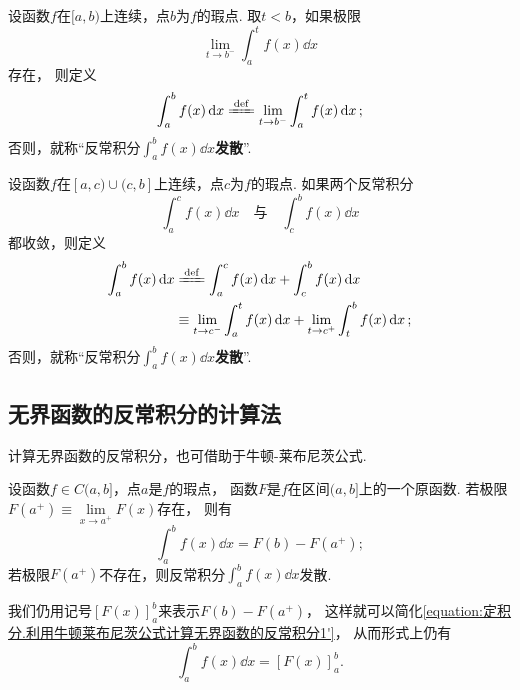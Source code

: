 \begin{definition}\label{definition:定积分.无界函数的反常积分的定义2}
设函数\(f\)在\([a,b)\)上连续，点\(b\)为\(f\)的瑕点.
取\(t < b\)，如果极限\[
\lim\limits_{t \to b^-} \int_a^t f(x) \dd{x}
\]存在，%
则定义
\begin{equation}
\int_a^b f(x) \dd{x}
\defeq
\lim\limits_{t \to b^-} \int_a^t f(x) \dd{x};
\end{equation}
否则，就称“反常积分\(\int_a^b f(x) \dd{x}\)\textbf{发散}”.
\end{definition}

\begin{definition}\label{definition:定积分.无界函数的反常积分的定义3}
设函数\(f\)在\([a,c)\cup(c,b]\)上连续，点\(c\)为\(f\)的瑕点.
如果两个反常积分\[
\int_a^c f(x) \dd{x}
\quad\text{与}\quad
\int_c^b f(x) \dd{x}
\]都收敛，则定义
\begin{equation}
\begin{split}
\int_a^b f(x) \dd{x}
&\defeq \int_a^c f(x) \dd{x} + \int_c^b f(x) \dd{x} \\
&\equiv \lim\limits_{t \to c^-} \int_a^t f(x) \dd{x}
	+ \lim\limits_{t \to c^+} \int_t^b f(x) \dd{x};
\end{split}
\end{equation}
否则，就称“反常积分\(\int_a^b f(x) \dd{x}\)\textbf{发散}”.
\end{definition}

\subsection{无界函数的反常积分的计算法}
计算无界函数的反常积分，也可借助于牛顿-莱布尼茨公式.
\begin{theorem}\label{theorem:定积分.利用牛顿莱布尼茨公式计算无界函数的反常积分1}
设函数\(f \in C(a,b]\)，点\(a\)是\(f\)的瑕点，%
函数\(F\)是\(f\)在区间\((a,b]\)上的一个原函数.
若极限\(F(a^+) \equiv \lim\limits_{x \to a^+} F(x)\)存在，%
则有
\begin{equation}\label{equation:定积分.利用牛顿莱布尼茨公式计算无界函数的反常积分1'}
\int_a^b f(x) \dd{x}
= F(b) - F(a^+);
\end{equation}
若极限\(F(a^+)\)不存在，则反常积分\(\int_a^b f(x) \dd{x}\)发散.
\end{theorem}
我们仍用记号\([F(x)]_a^b\)来表示\(F(b) - F(a^+)\)，%
这样就可以简化\cref{equation:定积分.利用牛顿莱布尼茨公式计算无界函数的反常积分1'}，%
从而形式上仍有
\begin{equation}\label{equation:定积分.利用牛顿莱布尼茨公式计算无界函数的反常积分1}
\int_a^b f(x) \dd{x} = [F(x)]_a^b.
\end{equation}

